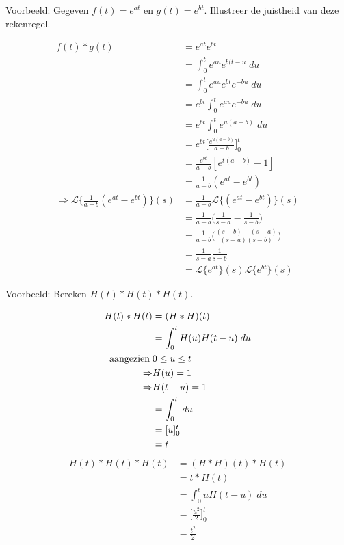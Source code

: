 \documentclass[12pt]{report}
\newcommand{\example}[2]{
    \hrulefill
    
    Voorbeeld: #1
    
    #2
    
    \hrulefill
}
\begin{document}
\example{Gegeven $f(t) = e^{at}$ en $g(t) = e^{bt}$. Illustreer de juistheid van deze rekenregel.}{
\begin{equation*}
 \begin{split}
    f(t) * g(t) & = e^{at} e^{bt} \\
                & = \int_{0}^{t} e^{au}e^{b(t-u}\; du\\
                & = \int_{0}^{t} e^{au}e^{bt}e^{-bu}\; du\\
                & = e^{bt}\int_{0}^{t} e^{au}e^{-bu}\; du\\
                & = e^{bt}\int_{0}^{t} e^{u(a-b)}\; du\\
                & = e^{bt}\bigg[\frac{e^{u(a-b)}}{a - b}\bigg]_0^t\\
                & = \frac{e^{bt}}{a - b}[e^{t(a-b)} - 1] \\
                & = \frac{1}{a - b}(e^{at} - e^{bt}) \\
    \Rightarrow \mathcal{L}\{\frac{1}{a - b}(e^{at} - e^{bt})\}(s) & = \frac{1}{a - b}\mathcal{L}\{(e^{at} - e^{bt})\}(s) \\
                                                                   & = \frac{1}{a - b}\bigg(\frac{1}{s-a} - \frac{1}{s - b}\bigg) \\
                                                                   & = \frac{1}{a - b}\bigg(\frac{(s - b) - (s - a)}{(s - a)(s - b)}\bigg) \\
                                                                   & = \frac{1}{s - a}\frac{1}{s - b} \\
                                                                   & = \mathcal{L}\{e^{at}\}(s)\mathcal{L}\{e^{bt}\}(s)
 \end{split}
\end{equation*}
}
\example{Bereken $H(t)*H(t)*H(t)$.}{
\begin{equation*}
 \begin{split}
  H(t) * H(t) & = (H * H)(t) \\
              & = \int_0^t H(u)H(t - u)\; du \\
            \hbox{aangezien}\; & 0 \leq u \leq t \\
            \Rightarrow & H(u)  = 1 \\
            \Rightarrow & H(t - u)  = 1 \\
              & = \int_0^t \; du \\
              & = [u]_0^t \\
              & = t
 \end{split}
\end{equation*}
\begin{equation*}
 \begin{split}
  H(t) * H(t) * H(t) & = (H * H)(t) * H(t) \\
                     & = t * H(t) \\
                     & = \int_0^t uH(t - u)\; du \\
                     & = \bigg[\frac{u^2}{2}\bigg]_0^t \\
                     & = \frac{t^2}{2}       
 \end{split}
\end{equation*}


}
\end{document}
